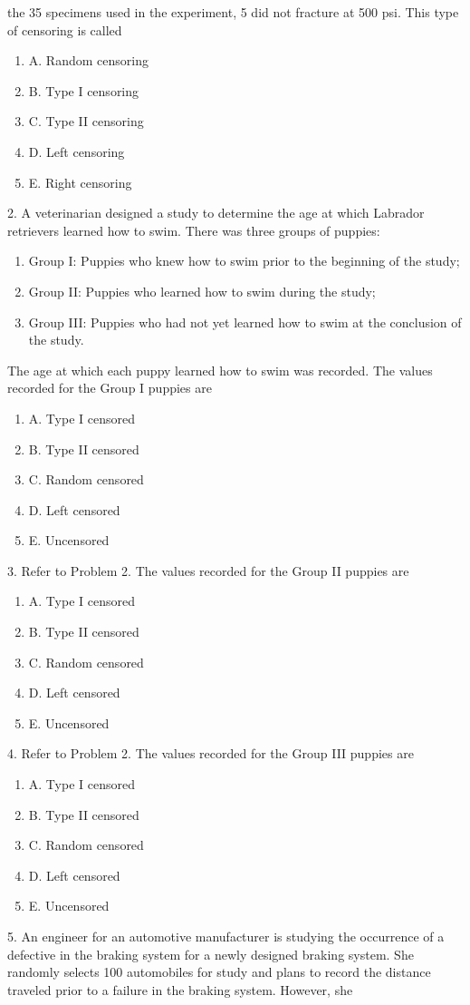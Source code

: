 \documentclass[10pt]{report}
\def\be{\begin{enumerate}}
\def\ee{\end{enumerate}}
\begin{document}
the 35 specimens used in the experiment, 5 did not fracture at 500 psi. This type of censoring is called
\be
\item[A.] Random censoring
\item[B.] Type I censoring
\item[C.] Type II censoring
\item[D.] Left censoring
\item[E.] Right censoring
\ee
\vfill\newpage
\item[2.] A veterinarian  designed a study to determine
the age at which Labrador retrievers  learned how to swim. There was three groups of puppies:
\be
\item[] Group I: Puppies who knew how to swim prior to the beginning of the study;
\item[] Group II: Puppies who learned how to swim during the study;
\item[] Group III: Puppies who had not yet learned how to swim at the conclusion of the study.
\ee
The age at which each puppy learned how to swim was recorded. The values recorded for the
Group I puppies are
\be
\item[A.] Type I censored
\item[B.] Type II censored
\item[C.] Random censored
\item[D.] Left censored
\item[E.] Uncensored
\ee
\item[3.]  Refer to Problem 2. The values recorded for the
Group II puppies are
\be
\item[A.] Type I censored
\item[B.] Type II censored
\item[C.] Random censored
\item[D.] Left censored
\item[E.] Uncensored
\ee
\item[4.]  Refer to Problem 2. The values recorded for the
Group III puppies are
\be
\item[A.] Type I censored
\item[B.] Type II censored
\item[C.] Random censored
\item[D.] Left censored
\item[E.] Uncensored
\ee
\item[5.]  An engineer for an automotive manufacturer  is
studying the occurrence of a defective in the braking system for a newly designed braking system. She randomly selects 100
automobiles for study and plans to record the distance traveled prior to a failure in the braking system. However, she
\end{document}
